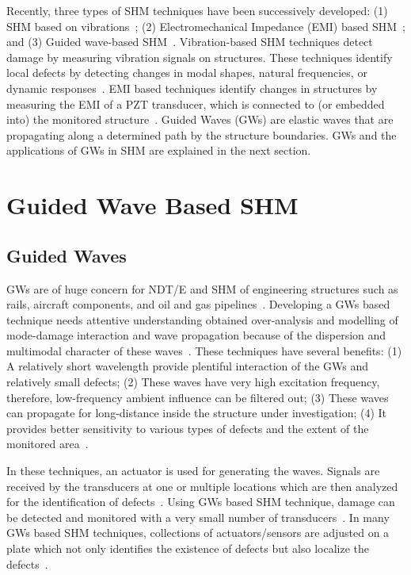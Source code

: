 \documentclass[b5paper, 11pt, titlepage]{book}
\begin{document}
Recently, three types of SHM techniques have been successively developed: (1)  SHM based on vibrations~\cite{deraemaeker2012new, MMaia}; (2) Electromechanical Impedance (EMI) based SHM~\cite{liang1997coupled, Fiborek2018}; and (3) Guided wave-based SHM~\cite{Raghavan2007, Mei2019,Tian2015,Park2014,Sikdar2019,Girolamo2018,Rogge2013,Kudela2018}. Vibration-based SHM techniques detect damage by measuring vibration signals on structures. These techniques identify local defects by detecting changes in modal shapes, natural frequencies, or dynamic responses~\cite{deraemaeker2012new, MMaia}. EMI based techniques identify changes in structures by measuring the EMI of a PZT transducer, which is connected to (or embedded into) the monitored structure~\cite{liang1997coupled, Fiborek2018}. Guided Waves (GWs) are elastic waves that are propagating along a determined path by the structure boundaries. GWs and the applications of GWs in SHM are explained in the next section.

\section{Guided Wave Based SHM}
\subsection{Guided Waves}

GWs are of huge concern for NDT/E and SHM of engineering structures such as rails, aircraft components, and oil and gas pipelines~\cite{rose1998ultrasonic, fromme2006development, wilcox2003guided, gao2009ice}. Developing a GWs based technique needs attentive understanding obtained over-analysis and modelling of mode-damage interaction and wave propagation because of the dispersion and multimodal character of these waves~\cite{Lugovtsova2019}. These techniques have several benefits: (1) A relatively short wavelength provide plentiful interaction of the GWs and relatively small defects; (2) These waves have very high excitation frequency, therefore, low-frequency ambient influence can be filtered out; (3) These waves can propagate for long-distance inside the structure under investigation; (4) It provides better sensitivity to various types of defects and the extent of the monitored area~\cite{Wang2020}.

In these techniques, an actuator is used for generating the waves. Signals are received by the transducers at one or multiple locations which are then analyzed for the identification of defects~\cite{Wang2020}. Using GWs based SHM technique, damage can be detected and monitored with a very small number of transducers~\cite{Mitra2016, Cawley2003, Munian2018}. In many GWs based SHM techniques, collections of actuators/sensors are adjusted on a plate which not only identifies the existence of defects but also localize the defects~\cite{Farrar2012}.
\end{document}
